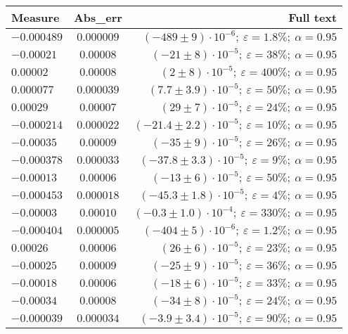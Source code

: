 \documentclass{article}%
\begin{document}
\begin{longtable}{| l | c | r |}%
\hline%
\rowcolor{lightgray}%
\textbf{Measure}&\textbf{Abs\_err}&\textbf{Full text}\\%
\hline%
$-0.000489$&$0.000009$&$(-489 \pm 9) \cdot 10 ^{-6};\:\varepsilon = 1.8\%; \: \alpha = 0.95$\\%
\hline%
$-0.00021$&$0.00008$&$(-21 \pm 8) \cdot 10 ^{-5};\:\varepsilon = 38\%; \: \alpha = 0.95$\\%
\hline%
$0.00002$&$0.00008$&$(2 \pm 8) \cdot 10 ^{-5};\:\varepsilon = 400\%; \: \alpha = 0.95$\\%
\hline%
$0.000077$&$0.000039$&$(7.7 \pm 3.9) \cdot 10 ^{-5};\:\varepsilon = 50\%; \: \alpha = 0.95$\\%
\hline%
$0.00029$&$0.00007$&$(29 \pm 7) \cdot 10 ^{-5};\:\varepsilon = 24\%; \: \alpha = 0.95$\\%
\hline%
$-0.000214$&$0.000022$&$(-21.4 \pm 2.2) \cdot 10 ^{-5};\:\varepsilon = 10\%; \: \alpha = 0.95$\\%
\hline%
$-0.00035$&$0.00009$&$(-35 \pm 9) \cdot 10 ^{-5};\:\varepsilon = 26\%; \: \alpha = 0.95$\\%
\hline%
$-0.000378$&$0.000033$&$(-37.8 \pm 3.3) \cdot 10 ^{-5};\:\varepsilon = 9\%; \: \alpha = 0.95$\\%
\hline%
$-0.00013$&$0.00006$&$(-13 \pm 6) \cdot 10 ^{-5};\:\varepsilon = 50\%; \: \alpha = 0.95$\\%
\hline%
$-0.000453$&$0.000018$&$(-45.3 \pm 1.8) \cdot 10 ^{-5};\:\varepsilon = 4\%; \: \alpha = 0.95$\\%
\hline%
$-0.00003$&$0.00010$&$(-0.3 \pm 1.0) \cdot 10 ^{-4};\:\varepsilon = 330\%; \: \alpha = 0.95$\\%
\hline%
$-0.000404$&$0.000005$&$(-404 \pm 5) \cdot 10 ^{-6};\:\varepsilon = 1.2\%; \: \alpha = 0.95$\\%
\hline%
$0.00026$&$0.00006$&$(26 \pm 6) \cdot 10 ^{-5};\:\varepsilon = 23\%; \: \alpha = 0.95$\\%
\hline%
$-0.00025$&$0.00009$&$(-25 \pm 9) \cdot 10 ^{-5};\:\varepsilon = 36\%; \: \alpha = 0.95$\\%
\hline%
$-0.00018$&$0.00006$&$(-18 \pm 6) \cdot 10 ^{-5};\:\varepsilon = 33\%; \: \alpha = 0.95$\\%
\hline%
$-0.00034$&$0.00008$&$(-34 \pm 8) \cdot 10 ^{-5};\:\varepsilon = 24\%; \: \alpha = 0.95$\\%
\hline%
$-0.000039$&$0.000034$&$(-3.9 \pm 3.4) \cdot 10 ^{-5};\:\varepsilon = 90\%; \: \alpha = 0.95$\\%

\end{longtable}
\end{document}
